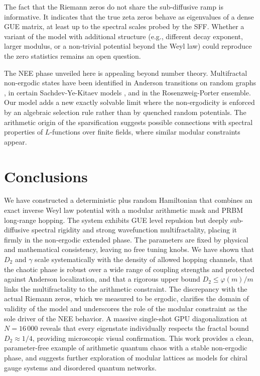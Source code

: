 \documentclass[11pt,a4paper]{article}
\begin{document}
The fact that the Riemann zeros do not share the sub-diffusive ramp is informative. It indicates that the true zeta zeros behave as eigenvalues of a dense GUE matrix, at least up to the spectral scales probed by the SFF. Whether a variant of the model with additional structure (e.g., different decay exponent, larger modulus, or a non-trivial potential beyond the Weyl law) could reproduce the zero statistics remains an open question.

The NEE phase unveiled here is appealing beyond number theory. Multifractal non-ergodic states have been identified in Anderson transitions on random graphs \cite{Kravtsov2015}, in certain Sachdev-Ye-Kitaev models \cite{Legramandi2024}, and in the Rosenzweig-Porter ensemble. Our model adds a new exactly solvable limit where the non-ergodicity is enforced by an algebraic selection rule rather than by quenched random potentials. The arithmetic origin of the sparsification suggests possible connections with spectral properties of $L$-functions over finite fields, where similar modular constraints appear.

\section{Conclusions}

We have constructed a deterministic plus random Hamiltonian that combines an exact inverse Weyl law potential with a modular arithmetic mask and PRBM long-range hopping. The system exhibits GUE level repulsion but deeply sub-diffusive spectral rigidity and strong wavefunction multifractality, placing it firmly in the non-ergodic extended phase. The parameters are fixed by physical and mathematical consistency, leaving no free tuning knobs. We have shown that $D_2$ and $\gamma$ scale systematically with the density of allowed hopping channels, that the chaotic phase is robust over a wide range of coupling strengths and protected against Anderson localization, and that a rigorous upper bound $D_2 \le \varphi(m)/m$ links the multifractality to the arithmetic constraint. The discrepancy with the actual Riemann zeros, which we measured to be ergodic, clarifies the domain of validity of the model and underscores the role of the modular constraint as the sole driver of the NEE behavior. A massive single-shot GPU diagonalization at $N=16\,000$ reveals that every eigenstate individually respects the fractal bound $D_2\approx 1/4$, providing microscopic visual confirmation. This work provides a clean, parameter-free example of arithmetic quantum chaos with a stable non-ergodic phase, and suggests further exploration of modular lattices as models for chiral gauge systems and disordered quantum networks.
\end{document}
